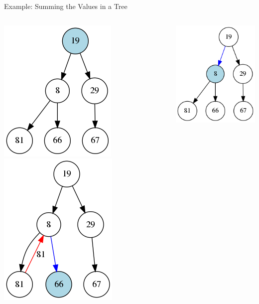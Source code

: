 \documentclass[11pt]{beamer}
\begin{document}
\begin{frame}{Example: Summing the Values in a Tree}
\begin{columns}
\begin{column}{0.33\textwidth}
\center
\includegraphics[scale=0.3]{graphs/summing_tree_1.png}
\includegraphics[scale=0.3]{graphs/summing_tree_4.png}
\end{column}
\begin{column}{0.33\textwidth}
\center
\includegraphics[scale=0.3]{graphs/summing_tree_2.png}

\end{column}
\end{columns}
\end{frame}
\end{document}
